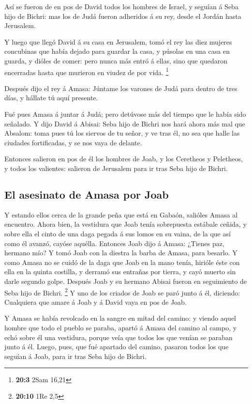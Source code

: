 Así se fueron de en pos de David todos los hombres de
Israel, y seguían á Seba hijo de Bichri: mas los de Judá fueron
adheridos á su rey, desde el Jordán hasta Jerusalem.

 Y luego que llegó David á su casa en Jerusalem, tomó el rey
las diez mujeres concubinas que había dejado para guardar la casa, y
púsolas en una casa en guarda, y dióles de comer: pero nunca más entró á
ellas, sino que quedaron encerradas hasta que murieron en viudez de por
vida. \footnote{\textbf{20:3} 2Sam 16,21}

 Después dijo el rey á Amasa: Júntame los varones de Judá
para dentro de tres días, y hállate tú aquí presente.

 Fué pues Amasa á juntar á Judá; pero detúvose más del
tiempo que le había sido señalado.  Y dijo David á Abisai:
Seba hijo de Bichri nos hará ahora más mal que Absalom: toma pues tú los
siervos de tu señor, y ve tras él, no sea que halle las ciudades
fortificadas, y se nos vaya de delante.

 Entonces salieron en pos de él los hombres de Joab, y los
Ceretheos y Peletheos, y todos los valientes: salieron de Jerusalem para
ir tras Seba hijo de Bichri.

\hypertarget{el-asesinato-de-amasa-por-joab}{%
\subsection{El asesinato de Amasa por
Joab}\label{el-asesinato-de-amasa-por-joab}}

 Y estando ellos cerca de la grande peña que está en Gabaón,
salióles Amasa al encuentro. Ahora bien, la vestidura que Joab tenía
sobrepuesta estábale ceñida, y sobre ella el cinto de una daga pegada á
sus lomos en su vaina, de la que así como él avanzó, cayóse aquélla.
 Entonces Joab dijo á Amasa: ¿Tienes paz, hermano mío? Y
tomó Joab con la diestra la barba de Amasa, para besarlo. 
Y como Amasa no se cuidó de la daga que Joab en la mano tenía, hirióle
éste con ella en la quinta costilla, y derramó sus entrañas por tierra,
y cayó muerto sin darle segundo golpe. Después Joab y su hermano Abisai
fueron en seguimiento de Seba hijo de Bichri. \footnote{\textbf{20:10}
  1Re 2,5}  Y uno de los criados de Joab se paró junto á
él, diciendo: Cualquiera que amare á Joab y á David vaya en pos de Joab.

 Y Amasa se había revolcado en la sangre en mitad del
camino: y viendo aquel hombre que todo el pueblo se paraba, apartó á
Amasa del camino al campo, y echó sobre él una vestidura, porque veía
que todos los que venían se paraban junto á él.  Luego,
pues, que fué apartado del camino, pasaron todos los que seguían á Joab,
para ir tras Seba hijo de Bichri.

